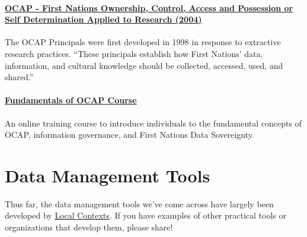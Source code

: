 \documentclass[
]{book}
\begin{document}
\hypertarget{ocap---first-nations-ownership-control-access-and-possession-or-self-determination-applied-to-research-2004}{%
\subsubsection*{\texorpdfstring{\href{https://biblio.uottawa.ca/sites/biblio.uottawa.ca/files/bestpractices_fnigc_ocap_fact_sheet_en_final.pdf}{OCAP - First Nations Ownership, Control, Access and Possession or Self Determination Applied to Research (2004)}}{OCAP - First Nations Ownership, Control, Access and Possession or Self Determination Applied to Research (2004)}}\label{ocap---first-nations-ownership-control-access-and-possession-or-self-determination-applied-to-research-2004}}

The OCAP Principals were first developed in 1998 in response to extractive research practices. ``These principals establish how First Nations' data, information, and cultural knowledge should be collected, accessed, used, and shared.''

\hypertarget{fundamentals-of-ocap-course}{%
\subsubsection*{\texorpdfstring{\href{https://fnigc.ca/ocap-training/take-the-course/}{Fundamentals of OCAP Course}}{Fundamentals of OCAP Course}}\label{fundamentals-of-ocap-course}}

An online training course to introduce individuals to the fundamental concepts of OCAP, information governance, and First Nations Data Sovereignty.

\hypertarget{data-management-tools}{%
\chapter{Data Management Tools}\label{data-management-tools}}

Thus far, the data management tools we've come across have largely been developed by \href{https://localcontexts.org/labels/biocultural-labels/}{Local Contexts}. If you have examples of other practical tools or organizations that develop them, please share!
\end{document}
